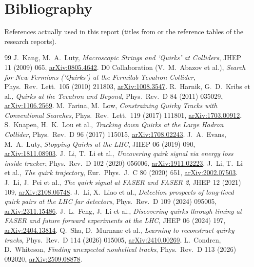 \documentclass[11pt,a4paper]{article}
\newcommand{\arx}[1]{\href{https://arxiv.org/abs/#1}{arXiv:#1}}
\DeclareRobustCommand{\file}[1]{\path{#1}}
\begin{document}
\appendix
\section{Bibliography}\label{app:bib}
References actually used in this report (titles from \file{bibliography.json} or the reference tables of the research reports).
\begingroup\small
\renewcommand{\section}[2]{}
\begin{thebibliography}{99}\setlength{\itemsep}{1pt}
 J.~Kang, M.~A.~Luty, \emph{Macroscopic Strings and `Quirks' at Colliders}, JHEP 11 (2009) 065, \arx{0805.4642}.
 D0 Collaboration (V.~M.~Abazov et al.), \emph{Search for New Fermions (`Quirks') at the Fermilab Tevatron Collider}, Phys.\ Rev.\ Lett.\ 105 (2010) 211803, \arx{1008.3547}.
 R.~Harnik, G.~D.~Kribs et al., \emph{Quirks at the Tevatron and Beyond}, Phys.\ Rev.\ D 84 (2011) 035029, \arx{1106.2569}.
 M.~Farina, M.~Low, \emph{Constraining Quirky Tracks with Conventional Searches}, Phys.\ Rev.\ Lett.\ 119 (2017) 111801, \arx{1703.00912}.
 S.~Knapen, H.~K.~Lou et al., \emph{Tracking down Quirks at the Large Hadron Collider}, Phys.\ Rev.\ D 96 (2017) 115015, \arx{1708.02243}.
 J.~A.~Evans, M.~A.~Luty, \emph{Stopping Quirks at the LHC}, JHEP 06 (2019) 090, \arx{1811.08903}.
 J.~Li, T.~Li et al., \emph{Uncovering quirk signal via energy loss inside tracker}, Phys.\ Rev.\ D 102 (2020) 056006, \arx{1911.02223}.
 J.~Li, T.~Li et al., \emph{The quirk trajectory}, Eur.\ Phys.\ J.\ C 80 (2020) 651, \arx{2002.07503}.
 J.~Li, J.~Pei et al., \emph{The quirk signal at FASER and FASER 2}, JHEP 12 (2021) 109, \arx{2108.06748}.
 J.~Li, X.~Liao et al., \emph{Detection prospects of long-lived quirk pairs at the LHC far detectors}, Phys.\ Rev.\ D 109 (2024) 095005, \arx{2311.15486}.
 J.~L.~Feng, J.~Li et al., \emph{Discovering quirks through timing at FASER and future forward experiments at the LHC}, JHEP 06 (2024) 197, \arx{2404.13814}.
 Q.~Sha, D.~Murnane et al., \emph{Learning to reconstruct quirky tracks}, Phys.\ Rev.\ D 114 (2026) 015005, \arx{2410.00269}.
 L.~Condren, D.~Whiteson, \emph{Finding unexpected nonhelical tracks}, Phys.\ Rev.\ D 113 (2026) 092020, \arx{2509.08878}.

\end{thebibliography}
\end{document}
